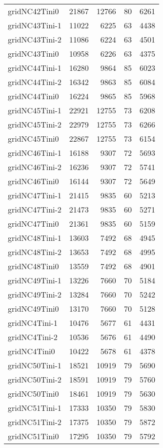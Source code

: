 \begin{longtable}{lrrrr}
gridNC42Tini0 & 21867 & 12766 & 80 & 6261 \\
gridNC43Tini-1 & 11022 & 6225 & 63 & 4438 \\
gridNC43Tini-2 & 11086 & 6224 & 63 & 4501 \\
gridNC43Tini0 & 10958 & 6226 & 63 & 4375 \\
gridNC44Tini-1 & 16280 & 9864 & 85 & 6023 \\
gridNC44Tini-2 & 16342 & 9863 & 85 & 6084 \\
gridNC44Tini0 & 16224 & 9865 & 85 & 5968 \\
gridNC45Tini-1 & 22921 & 12755 & 73 & 6208 \\
gridNC45Tini-2 & 22979 & 12755 & 73 & 6266 \\
gridNC45Tini0 & 22867 & 12755 & 73 & 6154 \\
gridNC46Tini-1 & 16188 & 9307 & 72 & 5693 \\
gridNC46Tini-2 & 16236 & 9307 & 72 & 5741 \\
gridNC46Tini0 & 16144 & 9307 & 72 & 5649 \\
gridNC47Tini-1 & 21415 & 9835 & 60 & 5213 \\
gridNC47Tini-2 & 21473 & 9835 & 60 & 5271 \\
gridNC47Tini0 & 21361 & 9835 & 60 & 5159 \\
gridNC48Tini-1 & 13603 & 7492 & 68 & 4945 \\
gridNC48Tini-2 & 13653 & 7492 & 68 & 4995 \\
gridNC48Tini0 & 13559 & 7492 & 68 & 4901 \\
gridNC49Tini-1 & 13226 & 7660 & 70 & 5184 \\
gridNC49Tini-2 & 13284 & 7660 & 70 & 5242 \\
gridNC49Tini0 & 13170 & 7660 & 70 & 5128 \\
gridNC4Tini-1 & 10476 & 5677 & 61 & 4431 \\
gridNC4Tini-2 & 10536 & 5676 & 61 & 4490 \\
gridNC4Tini0 & 10422 & 5678 & 61 & 4378 \\
gridNC50Tini-1 & 18521 & 10919 & 79 & 5690 \\
gridNC50Tini-2 & 18591 & 10919 & 79 & 5760 \\
gridNC50Tini0 & 18461 & 10919 & 79 & 5630 \\
gridNC51Tini-1 & 17333 & 10350 & 79 & 5830 \\
gridNC51Tini-2 & 17375 & 10350 & 79 & 5872 \\
gridNC51Tini0 & 17295 & 10350 & 79 & 5792 \\

\end{longtable}
